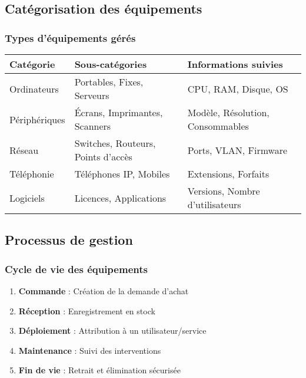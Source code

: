 \documentclass[12pt,a4paper]{article}
\begin{document}
\subsection{Catégorisation des équipements}

\subsubsection{Types d'équipements gérés}
\begin{center}
\begin{tabular}{|l|l|l|}
\hline
\textbf{Catégorie} & \textbf{Sous-catégories} & \textbf{Informations suivies} \\
\hline
Ordinateurs & Portables, Fixes, Serveurs & CPU, RAM, Disque, OS \\
Périphériques & Écrans, Imprimantes, Scanners & Modèle, Résolution, Consommables \\
Réseau & Switches, Routeurs, Points d'accès & Ports, VLAN, Firmware \\
Téléphonie & Téléphones IP, Mobiles & Extensions, Forfaits \\
Logiciels & Licences, Applications & Versions, Nombre d'utilisateurs \\
\hline
\end{tabular}
\end{center}

\subsection{Processus de gestion}

\subsubsection{Cycle de vie des équipements}
\begin{enumerate}
    \item \textbf{Commande} : Création de la demande d'achat
    \item \textbf{Réception} : Enregistrement en stock
    \item \textbf{Déploiement} : Attribution à un utilisateur/service
    \item \textbf{Maintenance} : Suivi des interventions
    \item \textbf{Fin de vie} : Retrait et élimination sécurisée
\end{enumerate}
\end{document}
